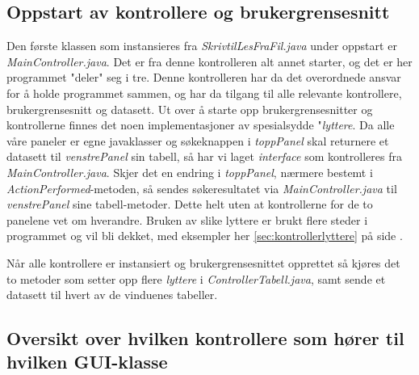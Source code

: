 \subsection{Oppstart av kontrollere og brukergrensesnitt}
Den første klassen som instansieres fra \emph{SkrivtilLesFraFil.java} under oppstart er \emph{MainController.java}.
Det er fra denne kontrolleren alt annet starter, og det er her programmet "deler" seg i tre. 
Denne kontrolleren har da det overordnede ansvar for å holde programmet sammen, og har da tilgang til alle relevante kontrollere, brukergrensesnitt og datasett. 
Ut over å starte opp brukergrensesnitter og kontrollerne finnes det noen implementasjoner av spesialsydde "\emph{lyttere}. 
Da alle våre paneler er egne javaklasser og søkeknappen i \emph{toppPanel} skal returnere et datasett til \emph{venstrePanel} sin tabell, så har vi laget \emph{interface} som kontrolleres fra \emph{MainController.java}. Skjer det en endring i \emph{toppPanel}, nærmere bestemt i \emph{ActionPerformed}-metoden, så sendes søkeresultatet via \emph{MainController.java} til \emph{venstrePanel} sine tabell-metoder. Dette helt uten at kontrollerne for de to panelene vet om hverandre.
Bruken av slike lyttere er brukt flere steder i programmet og vil bli dekket, med eksempler her \ref{sec:kontrollerlyttere} på side \pageref{sec:kontrollerlyttere}.

Når alle kontrollere er instansiert og brukergrensesnittet opprettet så kjøres det to metoder som setter opp flere \emph{lyttere} i \emph{ControllerTabell.java}, samt sende et datasett til hvert av de vinduenes tabeller.


\subsection{Oversikt over hvilken kontrollere som hører til hvilken GUI-klasse}


